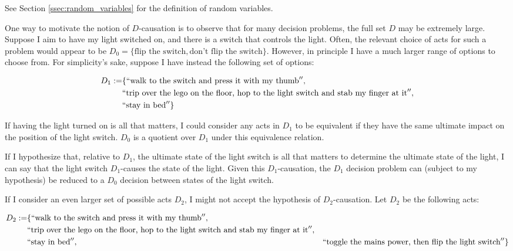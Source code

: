 See Section \ref{ssec:random_variables} for the definition of random variables.


One way to motivate the notion of $D$-causation is to observe that for many decision problems, the full set $D$ may be extremely large. Suppose I aim to have my light switched on, and there is a switch that controls the light. Often, the relevant choice of acts for such a problem would appear to be $D_0=\{\text{flip the switch},\text{don't flip the switch}\}$. However, in principle I have a much larger range of options to choose from. For simplicity's sake, suppose I have instead the following set of options:

\begin{align*}
D_1:=&\{``\text{walk to the switch and press it with my thumb}'', \\
    &``\text{trip over the lego on the floor, hop to the light switch and stab my finger at it}'',\\
    &``\text{stay in bed}''\}
\end{align*}

If having the light turned on is all that matters, I could consider any acts in $D_1$ to be equivalent if they have the same ultimate impact on the position of the light switch. $D_0$ is a quotient over $D_1$ under this equivalence relation. 

If I hypothesize that, relative to $D_1$, the ultimate state of the light switch is all that matters to determine the ultimate state of the light, I can say that the light switch $D_1$-causes the state of the light. Given this $D_1$-causation, the $D_1$ decision problem can (subject to my hypothesis) be reduced to a $D_0$ decision between states of the light switch.

If I consider an even larger set of possible acts $D_2$, I might not accept the hypothesis of $D_2$-causation. Let $D_2$ be the following acts:

\begin{align*}
D_2:=&\{``\text{walk to the switch and press it with my thumb}'', \\
    &``\text{trip over the lego on the floor, hop to the light switch and stab my finger at it}'',\\
    &``\text{stay in bed}'',
    &``\text{toggle the mains power, then flip the light switch}''\}
\end{align*}

